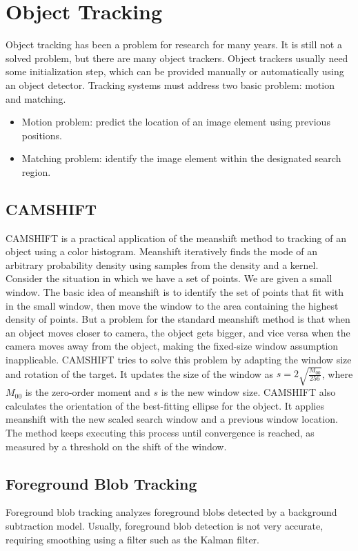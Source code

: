 \section{Object Tracking}
\label{Tracking}
Object tracking has been a problem for research for many years. It is still not a solved problem, but there are many object trackers. Object trackers usually need some initialization step, which can be provided manually or automatically using an object detector. Tracking systems must address two basic problem: motion and matching.
\begin{itemize}
	\item Motion problem: predict the location of an image element using previous positions.
	\item Matching problem: identify the image element within the designated search region.
\end{itemize}

\subsection{CAMSHIFT}
CAMSHIFT is a practical application of the meanshift method to tracking of an object using a color histogram. Meanshift iteratively finds the mode of an arbitrary probability density using samples from the density and a kernel. Consider the situation in which we have a set of points. We are given a small window. The basic idea of meanshift is to identify the set of points that fit with in the small window, then move the window to the area containing the highest density of points. But a problem for the standard meanshift method is that when an object moves closer to camera, the object gets bigger, and vice versa when the camera moves away from the object, making the fixed-size window assumption inapplicable. CAMSHIFT tries to solve this problem by adapting the window size and rotation of the target. It updates the size of the window as $ s = 2 \sqrt{\frac{M_{00}}{256}} $, where $M_{00}$ is the zero-order moment and $ s $ is the new window size. CAMSHIFT also calculates the orientation of the best-fitting ellipse for the object. It applies meanshift with the new scaled search window and a previous window location. The method keeps executing this process until convergence is reached, as measured by a threshold on the shift of the window.

\subsection{Foreground Blob Tracking}
Foreground blob tracking analyzes foreground blobs detected by a background subtraction model. Usually, foreground blob detection is not very accurate, requiring smoothing using a filter such as the Kalman filter.

